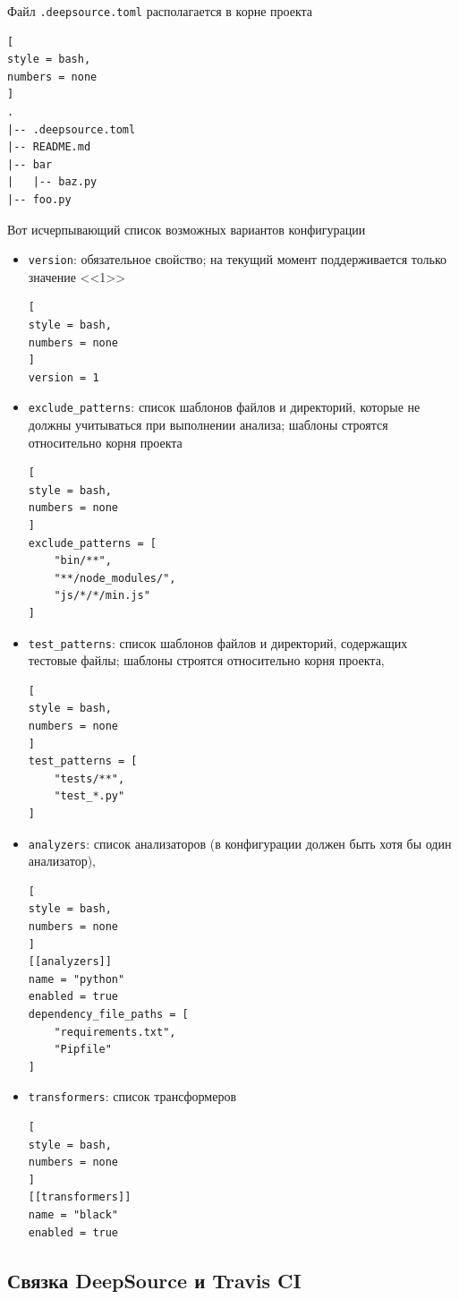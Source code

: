 \documentclass[%
	11pt,
	a4paper,
	utf8,
		]{article}
\begin{document}
Файл \texttt{.deepsource.toml} располагается в корне проекта
\begin{lstlisting}[
style = bash,
numbers = none	
]
.
|-- .deepsource.toml
|-- README.md
|-- bar
|   |-- baz.py
|-- foo.py
\end{lstlisting}

Вот исчерпывающий список возможных вариантов конфигурации
\begin{itemize}
	\item \texttt{version}: обязательное свойство; на текущий момент поддерживается только значение <<1>>
\begin{lstlisting}[
style = bash,
numbers = none	
]
version = 1
\end{lstlisting}
	
	\item \texttt{exclude\_patterns}: список шаблонов файлов и директорий, которые не должны учитываться при выполнении анализа; шаблоны строятся относительно корня проекта
\begin{lstlisting}[
style = bash,
numbers = none
]
exclude_patterns = [
    "bin/**",
    "**/node_modules/",
    "js/*/*/min.js"
]
\end{lstlisting}
	
	\item \texttt{test\_patterns}: список шаблонов файлов и директорий, содержащих тестовые файлы; шаблоны строятся относительно корня проекта,
\begin{lstlisting}[
style = bash,
numbers = none	
]
test_patterns = [
    "tests/**",
    "test_*.py"
]
\end{lstlisting}
	
	\item \texttt{analyzers}: список анализаторов (в конфигурации должен быть хотя бы один анализатор),
\begin{lstlisting}[
style = bash,
numbers = none	
]
[[analyzers]]
name = "python"
enabled = true
dependency_file_paths = [
    "requirements.txt",
    "Pipfile"
]
\end{lstlisting}
	
	\item \texttt{transformers}: список трансформеров
\begin{lstlisting}[
style = bash,
numbers = none	
]
[[transformers]]
name = "black"
enabled = true
\end{lstlisting}
\end{itemize}

\subsection{Связка DeepSource и Travis CI}
\end{document}
